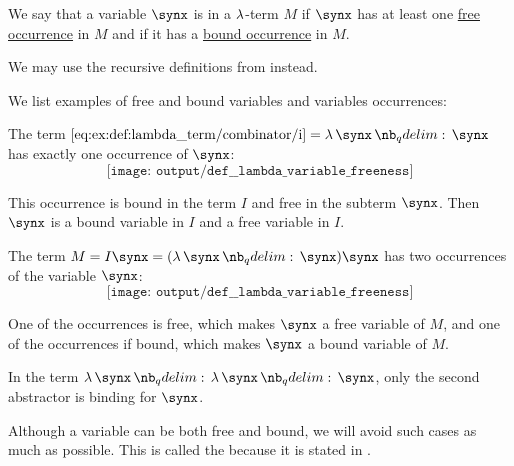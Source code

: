 \begin{definition}\label{def:lambda_variable_freeness}
  We say that a variable \( \synx \) is  in a \( \mathrm{\lambda} \)-term \( M \) if \( \synx \) has at least one \hyperref[def:lambda_variable_occurrence]{free occurrence} in \( M \) and  if it has a \hyperref[def:lambda_variable_occurrence]{bound occurrence} in \( M \).
\end{definition}
\begin{comments}
  \item We may use the recursive definitions from  instead.
\end{comments}

\begin{example}\label{ex:def:lambda_variable_freeness}
  We list examples of free and bound variables and variables occurrences:
  \begin{thmenum}
     The term \( \ref{eq:ex:def:lambda_term/combinator/i} = \qabs \synx \synx \) has exactly one occurrence of \( \synx \):
    \begin{equation*}
      \texttt{[image: output/def\_\_lambda\_variable\_freeness]}
    \end{equation*}

     This occurrence is bound in the term \( I \) and free in the subterm \( \synx \). Then \( \synx \) is a bound variable in \( I \) and a free variable in \( I \).

     The term \( M = I \synx = (\qabs \synx \synx) \synx \) has two occurrences of the variable \( \synx \):
    \begin{equation*}
      \texttt{[image: output/def\_\_lambda\_variable\_freeness]}
    \end{equation*}

    One of the occurrences is free, which makes \( \synx \) a free variable of \( M \), and one of the occurrences if bound, which makes \( \synx \) a bound variable of \( M \).

     In the term \( \qabs \synx \qabs \synx \synx \), only the second abstractor is binding for \( \synx \).
  \end{thmenum}
\end{example}

\begin{remark}\label{rem:barendregt_convention}
  Although a variable can be both free and bound, we will avoid such cases as much as possible. This is called the  because it is stated in .
\end{remark}

